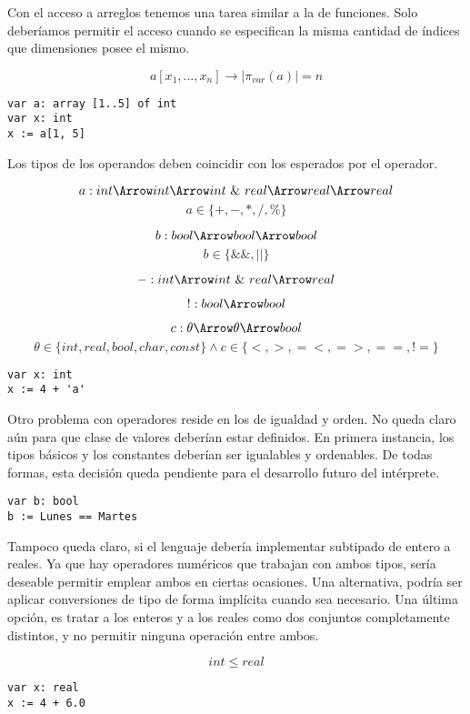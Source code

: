 \documentclass{article}
\begin{document}
Con el acceso a arreglos tenemos una tarea similar a la de funciones.
Solo deberíamos permitir el acceso cuando se especifican la misma cantidad de índices que dimensiones posee el mismo.

\[ a[x_1, ..., x_n] \rightarrow |\pi_{var}(a)| = n \]

\begin{lstlisting}[style = my_lang]
var a: array [1..5] of int
var x: int
x := a[1, 5]
\end{lstlisting}

Los tipos de los operandos deben coincidir con los esperados por el operador.

\[
a: int \Arrow int \Arrow int 
\ \& \
real \Arrow real \Arrow real
\]
\[
a \in \{+, -, *, /, \% \}
\]

\[
b: bool \Arrow bool \Arrow bool 
\]
\[
b \in \{\&\&, ||\}
\]

\[
-:  int \Arrow int 
\ \& \   
real \Arrow real
\]

\[
!:  bool \Arrow bool
\]

\[
c: \theta \Arrow \theta \Arrow bool 
\]
\[
\theta \in \{int, real, bool, char, const\}
\wedge
c \in \{<, >, =<, =>, ==, !=\}
\]

\begin{lstlisting}[style = my_lang]
var x: int
x := 4 + 'a'
\end{lstlisting}

Otro problema con operadores reside en los de igualdad y orden.
No queda claro aún para que clase de valores deberían estar definidos.
En primera instancia, los tipos básicos y los constantes deberían ser igualables y ordenables.
De todas formas, esta decisión queda pendiente para el desarrollo futuro del intérprete.

\begin{lstlisting}[style = my_lang]
var b: bool
b := Lunes == Martes
\end{lstlisting}

Tampoco queda claro, si el lenguaje debería implementar subtipado de entero a reales.
Ya que hay operadores numéricos que trabajan con ambos tipos, sería deseable permitir emplear ambos en ciertas ocasiones.
Una alternativa, podría ser aplicar conversiones de tipo de forma implícita cuando sea necesario.
Una última opción, es tratar a los enteros y a los reales como dos conjuntos completamente distintos, y no permitir ninguna operación entre ambos.

\[ int \leq real \]

\begin{lstlisting}[style = my_lang]
var x: real
x := 4 + 6.0
\end{lstlisting}
\fi
\end{document}
